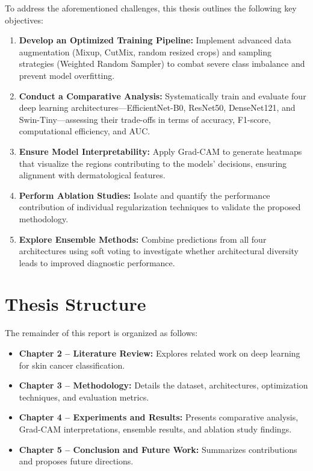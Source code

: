 \documentclass[11pt,a4paper]{report}
\begin{document}
To address the aforementioned challenges, this thesis outlines the following key objectives:
\begin{enumerate}
    \item \textbf{Develop an Optimized Training Pipeline:} Implement advanced data augmentation (Mixup, CutMix, random resized crops) and sampling strategies (Weighted Random Sampler) to combat severe class imbalance and prevent model overfitting.
    \item \textbf{Conduct a Comparative Analysis:} Systematically train and evaluate four deep learning architectures---EfficientNet-B0, ResNet50, DenseNet121, and Swin-Tiny---assessing their trade-offs in terms of accuracy, F1-score, computational efficiency, and AUC.
    \item \textbf{Ensure Model Interpretability:} Apply Grad-CAM to generate heatmaps that visualize the regions contributing to the models' decisions, ensuring alignment with dermatological features.
    \item \textbf{Perform Ablation Studies:} Isolate and quantify the performance contribution of individual regularization techniques to validate the proposed methodology.
    \item \textbf{Explore Ensemble Methods:} Combine predictions from all four architectures using soft voting to investigate whether architectural diversity leads to improved diagnostic performance.
\end{enumerate}

\section{Thesis Structure}

The remainder of this report is organized as follows:
\begin{itemize}
    \item \textbf{Chapter 2 -- Literature Review:} Explores related work on deep learning for skin cancer classification.
    \item \textbf{Chapter 3 -- Methodology:} Details the dataset, architectures, optimization techniques, and evaluation metrics.
    \item \textbf{Chapter 4 -- Experiments and Results:} Presents comparative analysis, Grad-CAM interpretations, ensemble results, and ablation study findings.
    \item \textbf{Chapter 5 -- Conclusion and Future Work:} Summarizes contributions and proposes future directions.
\end{itemize}
\end{document}
